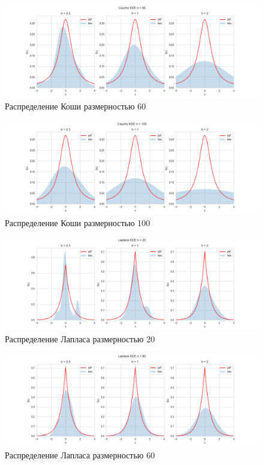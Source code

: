 \documentclass[12pt,a4paper]{article}
\begin{document}
\begin{figure}[H]
    \centering
    \includegraphics[scale=0.5]{images/Cauchy60.png}
    \caption{Распределение Коши размерностью 60}
\end{figure}

\begin{figure}[H]
    \centering
    \includegraphics[scale=0.5]{images/Cauchy100.png}
    \caption{Распределение Коши размерностью 100}
\end{figure}

\begin{figure}[H]
    \centering
    \includegraphics[scale=0.5]{images/Laplace20.png}
    \caption{Распределение Лапласа размерностью 20}
\end{figure}

\begin{figure}[H]
    \centering
    \includegraphics[scale=0.5]{images/Laplace60.png}
    \caption{Распределение Лапласа размерностью 60}
\end{figure}
\end{document}
